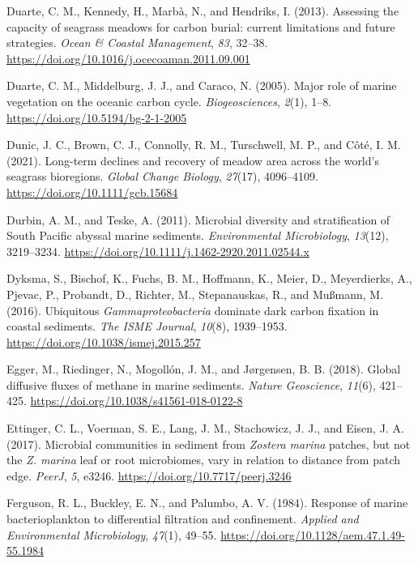 \documentclass[
  12 pt,
]{book}
\newlength{\cslhangindent}
\newlength{\cslentryspacingunit} %
\newenvironment{CSLReferences}[2] %
 {%
  \setlength{\parindent}{0pt}
  \ifodd #1
  \let\oldpar\par
  \def\par{\hangindent=\cslhangindent\oldpar}
  \fi
  \setlength{\parskip}{#2\cslentryspacingunit}
 }%
 {}
\begin{document}
\begin{CSLReferences}{1}{0}
\leavevmode{}%
Duarte, C. M., Kennedy, H., Marbà, N., and Hendriks, I. (2013). Assessing the capacity of seagrass meadows for carbon burial: current limitations and future strategies. \emph{Ocean \& Coastal Management}, \emph{83}, 32--38. \url{https://doi.org/10.1016/j.ocecoaman.2011.09.001}

\leavevmode{}%
Duarte, C. M., Middelburg, J. J., and Caraco, N. (2005). Major role of marine vegetation on the oceanic carbon cycle. \emph{Biogeosciences}, \emph{2}(1), 1--8. \url{https://doi.org/10.5194/bg-2-1-2005}

\leavevmode{}%
Dunic, J. C., Brown, C. J., Connolly, R. M., Turschwell, M. P., and Côté, I. M. (2021). Long-term declines and recovery of meadow area across the world's seagrass bioregions. \emph{Global Change Biology}, \emph{27}(17), 4096--4109. \url{https://doi.org/10.1111/gcb.15684}

\leavevmode{}%
Durbin, A. M., and Teske, A. (2011). Microbial diversity and stratification of {South Pacific} abyssal marine sediments. \emph{Environmental Microbiology}, \emph{13}(12), 3219--3234. \url{https://doi.org/10.1111/j.1462-2920.2011.02544.x}

\leavevmode{}%
Dyksma, S., Bischof, K., Fuchs, B. M., Hoffmann, K., Meier, D., Meyerdierks, A., Pjevac, P., Probandt, D., Richter, M., Stepanauskas, R., and Mußmann, M. (2016). Ubiquitous {{\emph{Gammaproteobacteria}}} dominate dark carbon fixation in coastal sediments. \emph{The ISME Journal}, \emph{10}(8), 1939--1953. \url{https://doi.org/10.1038/ismej.2015.257}

\leavevmode{}%
Egger, M., Riedinger, N., Mogollón, J. M., and Jørgensen, B. B. (2018). Global diffusive fluxes of methane in marine sediments. \emph{Nature Geoscience}, \emph{11}(6), 421--425. \url{https://doi.org/10.1038/s41561-018-0122-8}

\leavevmode{}%
Ettinger, C. L., Voerman, S. E., Lang, J. M., Stachowicz, J. J., and Eisen, J. A. (2017). Microbial communities in sediment from {{\emph{Zostera marina}}} patches, but not the {{\emph{Z. marina}}} leaf or root microbiomes, vary in relation to distance from patch edge. \emph{PeerJ}, \emph{5}, e3246. \url{https://doi.org/10.7717/peerj.3246}

\leavevmode{}%
Ferguson, R. L., Buckley, E. N., and Palumbo, A. V. (1984). Response of marine bacterioplankton to differential filtration and confinement. \emph{Applied and Environmental Microbiology}, \emph{47}(1), 49--55. \url{https://doi.org/10.1128/aem.47.1.49-55.1984}


\end{CSLReferences}
\end{document}
